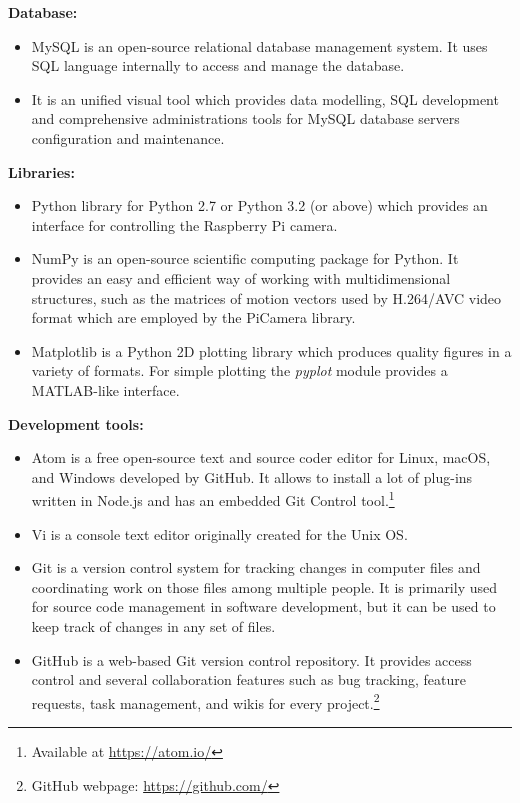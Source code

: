 \textbf{Database:}
\begin{itemize}
	\item {} MySQL is an open-source relational database management system. It uses \ac{SQL} language internally to access and manage the database.
	
	\item {} It is an unified visual tool which provides data modelling, SQL development and comprehensive administrations tools for MySQL database servers configuration and maintenance.  
	
\end{itemize}

\newpage
\textbf{Libraries:}
\begin{itemize}
	\item {} Python library for Python 2.7 or Python 3.2 (or above) which provides an interface for controlling the Raspberry Pi camera.
	
	\item {} NumPy is an open-source scientific computing package for Python. It provides an easy and efficient way of working with multidimensional structures, such as the matrices of motion vectors used by H.264/AVC video format which are employed by the PiCamera library.
	
	\item {} Matplotlib is a Python 2D plotting library which produces quality figures in a variety of formats. For simple plotting the \emph{pyplot} module provides a MATLAB-like interface.
	
\end{itemize}

\textbf{Development tools:}
\begin{itemize}
	\item {} Atom is a free open-source text and source coder editor for Linux, macOS, and Windows developed by GitHub. It allows to install a lot of plug-ins written in Node.js and has an embedded Git Control tool.\footnote{Available at \url{https://atom.io/}}
	
	\item {} Vi is a console text editor originally created for the Unix \ac{OS}. 
	
	\item {} Git is a version control system for tracking changes in computer files and coordinating work on those files among multiple people. It is primarily used for source code management in software development, but it can be used to keep track of changes in any set of files.
	
	\item {} GitHub is a web-based Git version control repository. It provides access control and several collaboration features such as bug tracking, feature requests, task management, and wikis for every project.\footnote{GitHub webpage: \url{https://github.com/}}	
	
\end{itemize}

